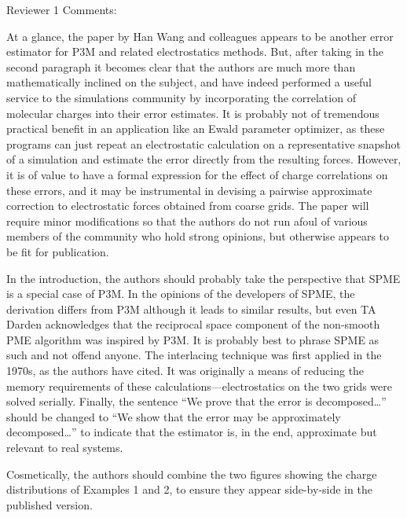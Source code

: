 \documentclass[a4paper]{article}
\begin{document}
Reviewer  1 Comments:

At a glance, the paper by Han Wang and colleagues appears to be another error estimator for P3M and related electrostatics methods.  But, after taking in the second paragraph it becomes clear that the authors are much more than mathematically inclined on the subject, and have indeed performed a useful service to the simulations community by incorporating the correlation of molecular charges into their error estimates.  It is probably not of tremendous practical benefit in an application like an Ewald parameter optimizer, as these programs can just repeat an electrostatic calculation on a representative snapshot of a simulation and estimate the error directly from the resulting forces.  However, it is of value to have a formal expression for the effect of charge correlations on these errors, and it may be instrumental in devising a pairwise approximate correction to electrostatic forces obtained from coarse grids.  The paper will require minor modifications so that the authors do not run afoul of various members of the community who hold strong opinions, but otherwise appears to be fit for publication.

In the introduction, the authors should probably take the perspective that SPME is a special case of P3M.  In the opinions of the developers of SPME, the derivation differs from P3M although it leads to similar results, but even TA Darden acknowledges that the reciprocal space component of the non-smooth PME algorithm was inspired by P3M.  It is probably best to phrase SPME as such and not offend anyone.  The interlacing technique was first applied in the 1970s, as the authors have cited.  It was originally a means of reducing the memory requirements of these calculations—electrostatics on the two grids were solved serially.  Finally, the sentence “We prove that the error is decomposed…” should be changed to “We show that the error may be approximately decomposed…” to indicate that the estimator is, in the end, approximate but relevant to real systems.

Cosmetically, the authors should combine the two figures showing the charge distributions of Examples 1 and 2, to ensure they appear side-by-side in the published version.
\end{document}
